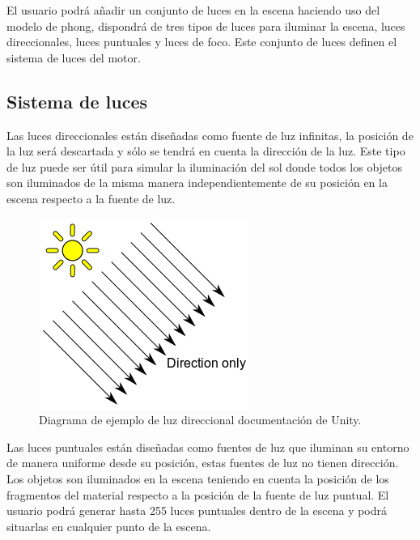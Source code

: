 \documentclass[a4paper, 17pt]{book}
\begin{document}
El usuario podrá añadir un conjunto de luces en la escena haciendo uso del modelo de phong, dispondrá de tres tipos de luces para
iluminar la escena, luces direccionales, luces puntuales y luces de foco. Este conjunto de luces definen el sistema de luces del motor.


\subsection{Sistema de luces} 
\label{sec:Luces}

Las luces direccionales están diseñadas como fuente de luz infinitas, la posición de la luz será descartada y sólo se tendrá en cuenta
la dirección de la luz. Este tipo de luz puede ser útil para simular la iluminación del sol donde todos los objetos son iluminados de
la misma manera independientemente de su posición en la escena respecto a la fuente de luz.

\begin{figure}[hbt!]
    \centering
    \includegraphics[scale=0.5, keepaspectratio]{img/DirectionalLightDiagram.png}
    \caption{ Diagrama de ejemplo de luz direccional documentación de Unity.}
    \label{figura:Component}
\end{figure}

Las luces puntuales están diseñadas como fuentes de luz que iluminan su entorno de manera uniforme desde su posición, estas fuentes de
luz no tienen dirección. Los objetos son iluminados en la escena teniendo en cuenta la posición de los fragmentos del material respecto
a la posición de la fuente de luz puntual. El usuario podrá generar hasta 255 luces puntuales dentro de la escena y podrá situarlas en
cualquier punto de la escena.
\end{document}
